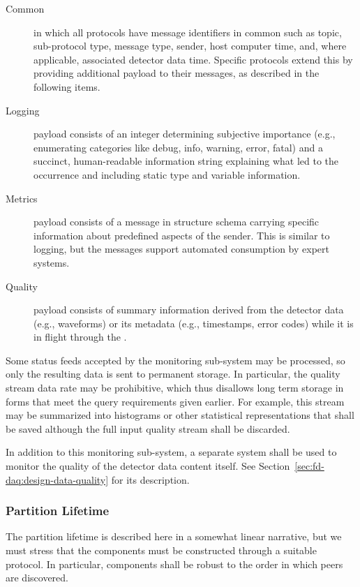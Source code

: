 \begin{description}
\item[Common] in which all protocols have message identifiers in common such as  topic, sub-protocol type, message type, sender, host computer time, and, where applicable, associated detector data time.  Specific protocols extend this by providing additional payload to their messages, as described in the following items.
 
\item[Logging] payload consists of an integer determining subjective importance (e.g., enumerating categories like debug, info, warning, error, fatal) and a succinct, human-readable information string explaining what led to the occurrence and including static type and variable information. 
\item[Metrics] payload consists of a message in structure schema carrying specific information about predefined aspects of the sender. This is similar to logging, but the messages support automated consumption by expert systems.  
\item[Quality] payload consists of summary information derived from the detector data (e.g., waveforms) or its metadata (e.g., timestamps, error codes) while it is in flight through the .
\end{description}

Some status feeds accepted by the monitoring sub-system may be processed, so only the resulting data is sent to permanent storage. 
In particular, the quality stream data rate may be prohibitive, which thus disallows long term storage in forms that meet the query requirements given earlier. 
For example, this stream may be summarized into histograms or other statistical representations that shall be saved although the full input quality stream shall be discarded.

In addition to this   monitoring sub-system, a separate system shall be used to monitor the quality of the detector data content itself.  See Section~\ref{sec:fd-daq:design-data-quality} for its  description.

\subsubsection{Partition Lifetime}
\label{sec:daq:partition-lifetime}

The partition lifetime is described here in a somewhat linear narrative, but we must stress that the components must be constructed through a suitable protocol. 
In particular, components shall be robust to the order in which peers are discovered.

